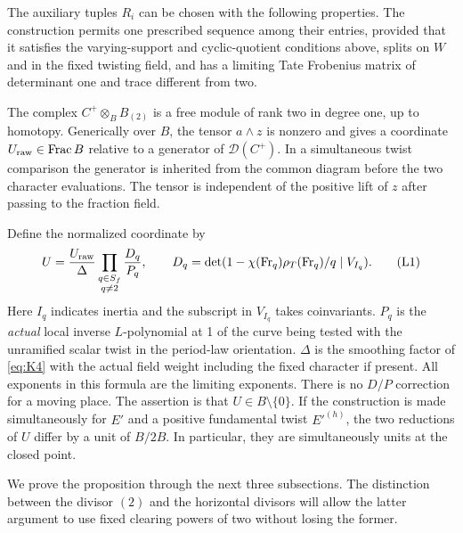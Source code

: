 \begin{proposition}\label{prop:positive-determinant:integral}
The auxiliary tuples \(R_i\) can be chosen with the following properties.
The construction permits one prescribed sequence among their entries, provided
that it satisfies the varying-support and cyclic-quotient conditions above,
splits on \(W\) and in the fixed twisting field, and has a limiting Tate
Frobenius matrix of determinant one and trace different from two.

The complex \(C^+\otimes_B B_{(2)}\) is a free module of rank two in degree
one, up to homotopy. Generically over \(B\), the tensor \(a\wedge z\) is
nonzero and gives a coordinate \(U_{\rm raw}\in\operatorname{Frac}B\) relative
to a generator of \(\mathcal D(C^+)\). In a simultaneous twist comparison the
generator is inherited from the common diagram before the two character
evaluations. The tensor is independent of the positive lift of \(z\) after
passing to the fraction field.

Define the normalized coordinate by
\[
 U=\frac{U_{\rm raw}}{\Delta}
                    \prod_{\substack{q\in S_f\\q\ne2}}\frac{D_q}{P_q},
 \qquad
 D_q=\det(1-\chi({\rm Fr}_q)\rho_T({\rm Fr}_q)/q\mid V_{I_q}).   \tag{L1}\label{eq:L1}
\]
Here \(I_q\) indicates inertia and the subscript in \(V_{I_q}\) takes coinvariants. \(P_q\) is the \emph{actual} local inverse \(L\)-polynomial at 1 of the curve being tested with the unramified scalar twist in the period-law orientation. \(\Delta\) is the smoothing factor of \eqref{eq:K4} with the actual field weight including the fixed character if present. All exponents in this formula are the limiting exponents. There is no
\(D/P\) correction for a moving place. The assertion is that \(U\in B\setminus\{0\}\).
If the construction is made simultaneously for \(E'\) and a positive
fundamental twist \(E'^{(h)}\), the two reductions of \(U\) differ by a unit
of \(B/2B\). In particular, they are simultaneously units at the closed point.
\end{proposition}

We prove the proposition through the next three subsections. The distinction
between the divisor \((2)\) and the horizontal divisors will allow the latter
argument to use fixed clearing powers of two without losing the former.

